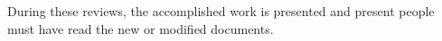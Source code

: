 \begin{changebar}
During these reviews, the accomplished work is presented and present people must have read the new or modified documents.




\end{changebar}
